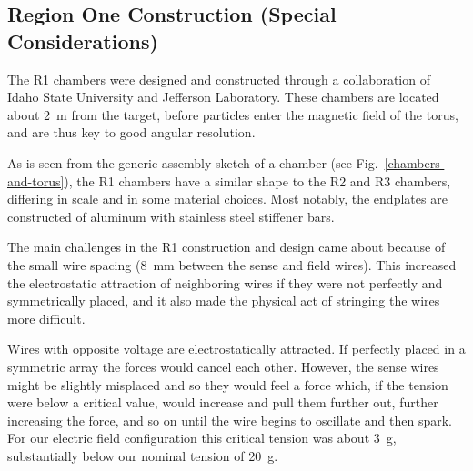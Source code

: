 \subsection{Region One Construction (Special Considerations)}

The R1 chambers were designed and constructed through a collaboration 
of Idaho State University and Jefferson Laboratory. These chambers are located about 2~m from the target, 
before particles enter the magnetic field of the torus,
and are thus key to good angular resolution. 

As is seen from the generic assembly sketch of a chamber (see Fig.~\ref{chambers-and-torus}),
the R1 chambers have a similar shape to the R2 and R3 chambers, differing in
scale and in some material choices.
Most notably, the endplates are constructed of aluminum with stainless
steel stiffener bars.

The main challenges in the R1 construction and design came about because
of the small wire spacing (8~mm between the sense and field wires).  This
increased the electrostatic attraction of neighboring wires if they were
not perfectly and symmetrically placed, and it also made the physical act
of stringing the wires more difficult.

Wires with opposite voltage are electrostatically attracted.  If perfectly
placed in a symmetric array the forces would cancel each other. 
However, the sense wires might be slightly misplaced and so they would feel
a force which, if the tension were below a critical value, would increase
and pull them further out, further increasing the force, and so on until 
the wire begins to oscillate and then spark.  For our electric field configuration
this critical tension was about 3~g, substantially below our nominal
tension of 20~g.
